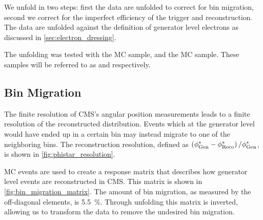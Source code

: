 We unfold in two steps: first the data are unfolded to correct for bin
migration, second we correct for the imperfect efficiency of the trigger and
reconstruction. The data are unfolded against the \dressed definition of
generator level electrons as discussed in \cref{sec:electron_dressing}.

The unfolding was tested with the \MADGRAPH \DYtoll MC sample, and the
\PPsixZtwo \DYtoee MC sample. These samples will be referred to as \MADGRAPH
and \POWHEG respectively.

\subsection{Bin Migration}
\label{ssec:bin_migration}

The finite resolution of CMS's angular position measurements leads to a finite
resolution of the reconstructed \phistar distribution. Events which at the
generator level would have ended up in a certain \phistar bin may instead
migrate to one of the neighboring bins. The \phistar reconstruction resolution,
defined as $\left( \phi^{*}_{\text{Gen}} - \phi^{*}_{\text{Reco}} \right) / \phi^{*}_{\text{Gen}}$, is shown
in \cref{fig:phistar_resolution}.

MC events are used to create a response matrix that describes how generator
level events are reconstructed in CMS. This matrix is shown in
\cref{fig:bin_migration_matrix}. The amount of bin migration, as measured by
the off-diagonal elements, is \SI{5.5}{\percent}. Through unfolding this matrix
is inverted, allowing us to transform the data to remove the undesired bin
migration.

